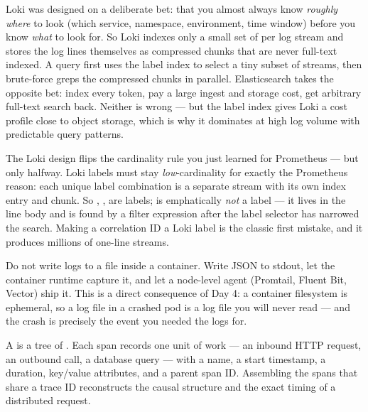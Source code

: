  Loki was designed on a deliberate bet: that you almost always know \emph{roughly where} to look (which service, namespace, environment, time window) before you know \emph{what} to look for. So Loki indexes only a small set of  per log stream and stores the log lines themselves as compressed chunks that are never full-text indexed. A query first uses the label index to select a tiny subset of streams, then brute-force greps the compressed chunks in parallel. Elasticsearch takes the opposite bet: index every token, pay a large ingest and storage cost, get arbitrary full-text search back. Neither is wrong --- but the label index gives Loki a cost profile close to object storage, which is why it dominates at high log volume with predictable query patterns.

\begin{tradeoff}
The Loki design flips the cardinality rule you just learned for Prometheus --- but only halfway. Loki labels must stay \emph{low}-cardinality for exactly the Prometheus reason: each unique label combination is a separate stream with its own index entry and chunk. So , ,  are labels;  is emphatically \emph{not} a label --- it lives in the line body and is found by a filter expression after the label selector has narrowed the search. Making a correlation ID a Loki label is the classic first mistake, and it produces millions of one-line streams.
\end{tradeoff}

\begin{opsnote}
Do not write logs to a file inside a container. Write JSON to stdout, let the container runtime capture it, and let a node-level agent (Promtail, Fluent Bit, Vector) ship it. This is a direct consequence of Day 4: a container filesystem is ephemeral, so a log file in a crashed pod is a log file you will never read --- and the crash is precisely the event you needed the logs for.
\end{opsnote}


 A  is a tree of . Each span records one unit of work --- an inbound HTTP request, an outbound call, a database query --- with a name, a start timestamp, a duration, key/value attributes, and a parent span ID. Assembling the spans that share a trace ID reconstructs the causal structure and the exact timing of a distributed request.

